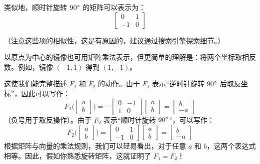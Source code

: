 \begin{example}
     类似地，顺时针旋转 $90 ^\circ$ 的矩阵可以表示为：
     \[\begin{bmatrix}
        0 & 1 \\
        -1 & 0
     \end{bmatrix}\]

     （注意这些项的相似性，这是有原因的，建议通过搜索引擎探索细节。）

   以原点为中心的镜像也可用矩阵乘法表示，但更简单的理解是：将两个坐标取相反数。例如，镜像 $(-1, 1)$ 得到 $(1, -1)$。

   这使我们能完整描述 $F_1$ 和 $F_2$ 的动作。由于 $F_1$ 表示``逆时针旋转 $90 ^\circ$ 后取反坐标''，因此可以写作：
    \[F_1\Bigg(\begin{bmatrix}
        a \\
        b
     \end{bmatrix}\Bigg) = -\begin{bmatrix}
        0 & -1 \\
        1 & 0
     \end{bmatrix}\begin{bmatrix}
        a \\
        b
     \end{bmatrix}=\begin{bmatrix}
        b \\
        -a
     \end{bmatrix}\]
     （负号用于取反操作）。由于 $F_2$ 表示``顺时针旋转 $90 ^\circ$''，可以写作：
     \[F_2\Bigg(\begin{bmatrix}
        a \\
        b
     \end{bmatrix}\Bigg) = \begin{bmatrix}
        0 & 1 \\
        -1 & 0
     \end{bmatrix}\begin{bmatrix}
        a \\
        b
     \end{bmatrix}=\begin{bmatrix}
        b \\
        -a
     \end{bmatrix}\]
     根据矩阵与向量的乘法规则，我们可以轻易看出，对于任意 $a$ 和 $b$，这两个表达式相等。因此，假如你熟悉旋转矩阵，这就证明了 $F_1 = F_2$！
\end{example}